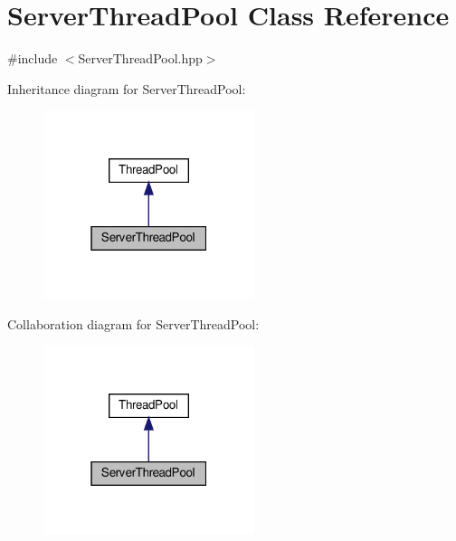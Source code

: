 \hypertarget{classServerThreadPool}{}\section{Server\+Thread\+Pool Class Reference}
\label{classServerThreadPool}


{\ttfamily \#include $<$Server\+Thread\+Pool.\+hpp$>$}



Inheritance diagram for Server\+Thread\+Pool\+:\nopagebreak
\begin{figure}[H]
\begin{center}
\leavevmode
\includegraphics[width=175pt]{classServerThreadPool__inherit__graph}
\end{center}
\end{figure}


Collaboration diagram for Server\+Thread\+Pool\+:\nopagebreak
\begin{figure}[H]
\begin{center}
\leavevmode
\includegraphics[width=175pt]{classServerThreadPool__coll__graph}
\end{center}
\end{figure}
